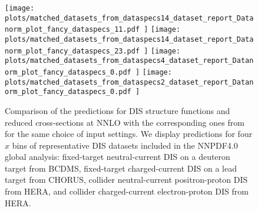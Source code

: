 \begin{figure}[!t]
  \centering
  \texttt{[image: 
    plots/matched\_datasets\_from\_dataspecs14\_dataset\_report\_Datanorm\_plot\_fancy\_dataspecs\_11.pdf
  ]}
  \texttt{[image: 
    plots/matched\_datasets\_from\_dataspecs14\_dataset\_report\_Datanorm\_plot\_fancy\_dataspecs\_23.pdf
  ]}
  \texttt{[image: 
    plots/matched\_datasets\_from\_dataspecs4\_dataset\_report\_Datanorm\_plot\_fancy\_dataspecs\_0.pdf
  ]}
  \texttt{[image: 
    plots/matched\_datasets\_from\_dataspecs2\_dataset\_report\_Datanorm\_plot\_fancy\_dataspecs\_0.pdf
  ]}
  \caption{
    Comparison of the \yadism predictions for DIS structure
    functions and reduced cross-sections at NNLO with the corresponding ones
    from \apfel for the same choice of input settings.
    We display  predictions for four $x$ bins of representative DIS datasets
    included in the NNPDF4.0 global analysis: fixed-target neutral-current DIS
    on a deuteron target from BCDMS, fixed-target charged-current DIS on a lead
    target from CHORUS, collider neutral-current positron-proton DIS from HERA,
    and collider charged-current electron-proton DIS from HERA.
  }    
  \label{fig/dis:benchmark-apfel-yadism}
\end{figure}
